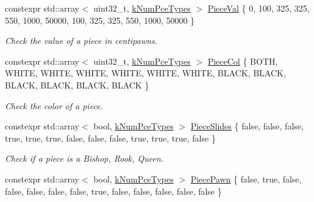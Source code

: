 \begin{DoxyCompactItemize}
\mbox{\label{namespacePieceInfo_a480c1e7f0033918244741fc9621ad985}} 
constexpr std\+::array$<$ uint32\+\_\+t, \mbox{\hyperlink{constants_8h_a65fd654c96b3bb6b2e3f2e5c2d5bb09c}{k\+Num\+Pce\+Types}} $>$ \mbox{\hyperlink{namespacePieceInfo_a480c1e7f0033918244741fc9621ad985}{Piece\+Val}} \{ 0, 100, 325, 325, 550, 1000, 50000, 100, 325, 325, 550, 1000, 50000 \}
\begin{DoxyCompactList}\small\item\em Check the value of a piece in centipawns. \end{DoxyCompactList}\item 
\mbox{\label{namespacePieceInfo_adecc5f24c6e2e38a94ec6484b5af3b23}} 
constexpr std\+::array$<$ uint32\+\_\+t, \mbox{\hyperlink{constants_8h_a65fd654c96b3bb6b2e3f2e5c2d5bb09c}{k\+Num\+Pce\+Types}} $>$ \mbox{\hyperlink{namespacePieceInfo_adecc5f24c6e2e38a94ec6484b5af3b23}{Piece\+Col}} \{ B\+O\+TH, W\+H\+I\+TE, W\+H\+I\+TE, W\+H\+I\+TE, W\+H\+I\+TE, W\+H\+I\+TE, W\+H\+I\+TE, B\+L\+A\+CK, B\+L\+A\+CK, B\+L\+A\+CK, B\+L\+A\+CK, B\+L\+A\+CK, B\+L\+A\+CK \}
\begin{DoxyCompactList}\small\item\em Check the color of a piece. \end{DoxyCompactList}\item 
\mbox{\label{namespacePieceInfo_a22da8fd00e51a3f0d7128893b4532aad}} 
constexpr std\+::array$<$ bool, \mbox{\hyperlink{constants_8h_a65fd654c96b3bb6b2e3f2e5c2d5bb09c}{k\+Num\+Pce\+Types}} $>$ \mbox{\hyperlink{namespacePieceInfo_a22da8fd00e51a3f0d7128893b4532aad}{Piece\+Slides}} \{ false, false, false, true, true, true, false, false, false, true, true, true, false \}
\begin{DoxyCompactList}\small\item\em Check if a piece is a Bishop, Rook, Queen. \end{DoxyCompactList}\item 
\mbox{\label{namespacePieceInfo_aba7ec3f5dc7d7fc2fc5e38f3d62cda56}} 
constexpr std\+::array$<$ bool, \mbox{\hyperlink{constants_8h_a65fd654c96b3bb6b2e3f2e5c2d5bb09c}{k\+Num\+Pce\+Types}} $>$ \mbox{\hyperlink{namespacePieceInfo_aba7ec3f5dc7d7fc2fc5e38f3d62cda56}{Piece\+Pawn}} \{ false, true, false, false, false, false, false, true, false, false, false, false, false \}

\end{DoxyCompactItemize}
